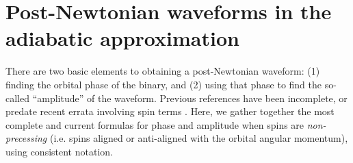 \newcommand{\xhat}{\vec{e}_x}
\newcommand{\yhat}{\vec{e}_y}
\newcommand{\zhat}{\vec{e}_z}
\newcommand{\ihat}{\vec{e}_i}
\newcommand{\jhat}{\vec{e}_j}
\newcommand{\rhat}{\vec{e}_{r}}
\newcommand{\iotahat}{\vec{e}_{\iota}}
\newcommand{\phihat}{\vec{e}_{\phi}}
\newcommand{\eplus}{\tens{e}_+}
\newcommand{\ecross}{\tens{e}_\times}
\newcommand{\Sl}{S_\ell}
\newcommand{\Sigmal}{\Sigma_\ell}
\newcommand{\Flux}{\mathcal{F}}
\newcommand{\coloneq}{\mathrel{\mathop:}=}
\newcommand{\define}{\coloneq}

\section{Post-Newtonian waveforms in the adiabatic approximation}
\renewcommand{\theequation}{A.\arabic{equation}}

There are two basic elements to obtaining a post-Newtonian waveform:
(1) finding the orbital phase of the binary, and (2) using that phase
to find the so-called ``amplitude'' of the waveform.  Previous
references have been incomplete, or predate recent errata involving
spin terms \cite{Blanchet:2006gy,Arun:2009}.  Here, we gather together the most complete and current
formulas for phase and amplitude when spins are \emph{non-precessing}
 (i.e. spins aligned or anti-aligned with the
  orbital angular momentum), using consistent
notation.

